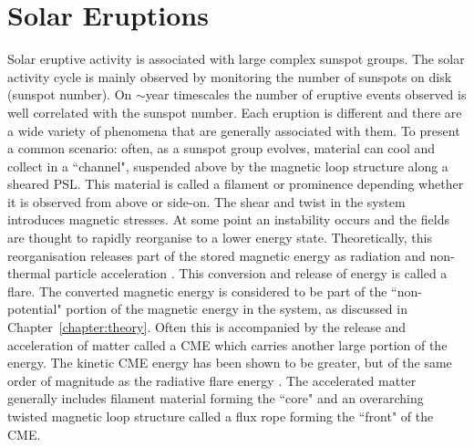 

\section{Solar Eruptions}\label{intro:solerupt}

Solar eruptive activity is associated with large complex sunspot groups. The solar activity cycle is mainly observed by monitoring the number of sunspots on disk (sunspot number). On $\sim$year timescales the number of eruptive events observed is well correlated with the sunspot number. Each eruption is different and there are a wide variety of phenomena that are generally associated with them. To present a common scenario: often, as a sunspot group evolves, material can cool and collect in a ``channel", suspended above by the magnetic loop structure along a sheared \gls{PSL}. This material is called a filament or prominence depending whether it is observed from above or side-on. The shear and twist in the system introduces magnetic stresses. At some point an instability occurs and the fields are thought to rapidly reorganise to a lower energy state. Theoretically, this reorganisation releases part of the stored magnetic energy as radiation and non-thermal particle acceleration \citep{Fletcher:2011}. This conversion and release of energy is called a flare. The converted magnetic energy is considered to be part of the ``non-potential" portion of the magnetic energy in the system, as discussed in Chapter~\ref{chapter:theory}. Often this is accompanied by the release and acceleration of matter called a \gls{CME} which carries another large portion of the energy. The kinetic \gls{CME} energy has been shown to be greater, but of the same order of magnitude as the radiative flare energy \citep{Emslie:2004}. The accelerated matter generally includes filament material forming the ``core" and an overarching twisted magnetic loop structure called a flux rope forming the ``front" of the \gls{CME}. 

